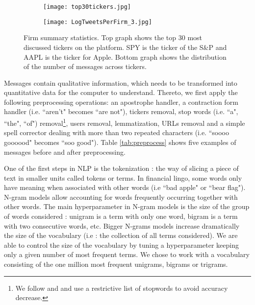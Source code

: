 \begin{figure*}[]
\centering
\begin{subfigure}{0.75\textwidth}  
            \centering 
            \texttt{[image: top30tickers.jpg]}
        \end{subfigure}
        \quad
        \begin{subfigure}{0.75\textwidth}   
            \centering 
            \texttt{[image: LogTweetsPerFirm\_3.jpg]}
        \end{subfigure}
        \caption{Firm summary statistics. Top graph shows the top 30 most discussed tickers on the platform. SPY is the ticker of the S\&P and AAPL is the ticker for Apple. Bottom graph shows the distribution of the number of messages across tickers.} 
        \label{fig:data-stocktwits2}
\end{figure*}

Messages contain qualitative information, which needs to be transformed into quantitative data for the computer to understand. Thereto, we first apply the following preprocessing operations: an apostrophe handler, a contraction form handler (i.e. ``aren't" becomes ``are not"), tickers removal, stop words (i.e. ``a", ``the", ``of") removal\footnote{We follow \citet{renault2020sentiment} and \citet{saif2014stopwords} and use a restrictive list of stopwords to avoid accuracy decrease.}, users removal, lemmatization, URLs removal and a simple spell corrector dealing with more than two repeated characters (i.e. ``soooo goooood" becomes ``soo good"). Table \ref{tab:preprocess} shows five examples of messages before and after preprocessing.
 
One of the first steps in NLP is the tokenization : the way of slicing a piece of text in smaller units called tokens or terms. In financial lingo, some words only have meaning when associated with other words (i.e ``bad apple" or ``bear flag"). N-gram models allow accounting for words frequently occurring together with other words. The main hyperparameter in N-gram models is the size of the group of words considered : unigram is a term with only one word, bigram is a term with two consecutive words, etc. Bigger N-grams models increase dramatically the size of the vocabulary (i.e : the collection of all terms considered). We are able to control the size of the vocabulary by tuning a hyperparameter keeping only a given number of most frequent terms.  We chose to work with a vocabulary consisting of the one million most frequent unigrams, bigrams or trigrams. 

